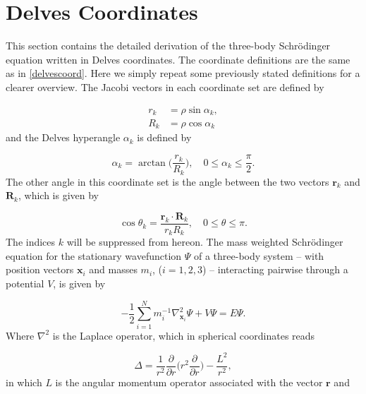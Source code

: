 \chapter{Delves Coordinates}\label{delves}
This section contains the detailed derivation of the three-body Schr{\"o}dinger equation written in Delves coordinates. The coordinate definitions are the same as in \cref{delvescoord}. Here we simply repeat some previously stated definitions for a clearer overview. The Jacobi vectors in each coordinate set are defined by

\begin{subequations}
	\begin{align}
	r_{k} &= \rho \sin{\alpha_{k}},\\
	R_{k} &= \rho \cos{\alpha_{k}}
	\end{align}
\end{subequations}
and the Delves hyperangle $\alpha_{k}$ is defined by

\begin{equation}
\alpha_{k} = \arctan\bigg(\frac{r_{k}}{R_{k}}\bigg), \quad 0\leq \alpha_{k} \leq \frac{\pi}{2}.
\end{equation}
The other angle in this coordinate set is the angle between the two vectors $\mathbf{r}_{k}$ and $\mathbf{R}_{k}$, which is given by

\begin{equation}
\cos{\theta_{k}} = \frac{\mathbf{r}_{k} \cdot \mathbf{R}_{k}}{r_{k} R_{k}}, \quad  0\leq \theta \leq \pi.
\end{equation}
The indices $k$ will be suppressed from hereon. The mass weighted Schr{\"o}dinger equation for the stationary wavefunction $\Psi$ of a three-body system -- with position vectors $\mathbf{x}_i$ and masses $m_i$, ($i=1,2,3$) -- interacting pairwise through a potential $V$, is given by

\begin{equation}
-\frac{1}{2} \sum_{i=1}^{N} m^{-1}_{i} \nabla^{2}_{\mathbf{x}_{i}} \Psi + V\Psi = E \Psi. 
\end{equation}
Where $\nabla^{2}$ is the Laplace operator, which in spherical coordinates reads

\begin{equation}
\Delta = \frac{1}{r^{2}}\frac{\partial}{\partial r} \bigg(r^{2} \frac{\partial}{\partial r}\bigg) - \frac{L^{2}}{r^{2}},
\end{equation}
in which $L$ is the angular momentum operator associated with the vector $\mathbf{r}$ and

